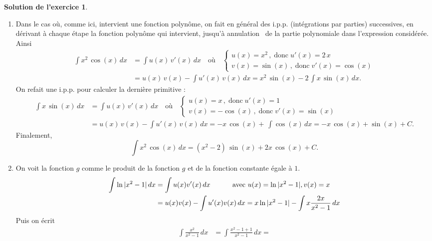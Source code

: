 \documentclass[a4paper, 11pt,openany]{article}%
\theoremstyle{plain}
\theoremstyle{definition}
\newtheorem{exo}{Exercice}
\newtheorem{sol}{Solution de l'exercice}
\theoremstyle{remark}
\begin{document}
%
\begin{sol}
\begin{enumerate}
\item Dans le cas où, comme ici, intervient une fonction polynôme, on fait en général des i.p.p. (intégrations par
parties) successives, en dérivant à chaque étape la fonction polynôme qui intervient, jusqu'à
\og annulation \fg\, de la partie polynomiale dans l'expression considérée. Ainsi
\begin{align*}\int x^2\, \cos(x)\, dx &= \int u(x)\, v'(x)\, dx \quad \text{où}\quad \begin{cases}
 u(x)=x^2\,,\;\text{donc}\; u'(x)=2\, x\\
 v(x)=\sin(x)\,,\;\text{donc}\;v'(x)=\cos(x)\end{cases}\\
&=u(x)\,v(x)-\int u'(x)\, v(x)\, dx
= x^2\, \sin(x)-2\,\int x\,\sin(x)\, dx.
\end{align*}
On refait une i.p.p. pour calculer la dernière primitive :
\begin{align*}\int x\, \sin(x)\, dx &= \int u(x)\, v'(x)\, dx \quad \text{où}\quad \begin{cases}
 u(x)=x\,,\;\text{donc}\; u'(x)=1\\
 v(x)=-\cos(x)\,,\;\text{donc}\;v'(x)=\sin(x)\end{cases}\\
&=u(x)\,v(x)-\int u'(x)\, v(x)\, dx
= -x\, \cos(x)+\,\int \cos(x)\, dx=-x\, \cos(x)+\sin(x)+C.
\end{align*}
Finalement, 
\[
\displaystyle{\int x^2\, \cos(x)\, dx =(x^2-2)\, \sin(x)+2x\, \cos(x)+C}.
\]
\item On voit la fonction $g$ comme le produit de la
fonction $g$ et de la fonction constante égale à $1$.
 \begin{align*}
   \int \ln|x^2-1|\, dx &= \int u(x) v'(x)\, dx \mbox{\hspace{1cm} avec }u(x)
   =\ln|x^2-1|, v(x)=x\\
&= u(x) v(x) -\int u'(x) v(x)\, dx 
= x \ln|x^2-1| - \int x \frac{2x}{x^2-1}\, dx
 \end{align*}
Puis on écrit
\begin{align*}
  \int  \frac{x^2}{x^2-1}\, dx &= \int \frac{x^2-1 +1}{x^2-1}\, dx =

\end{align*}
\end{enumerate}
\end{sol}
\end{document}
